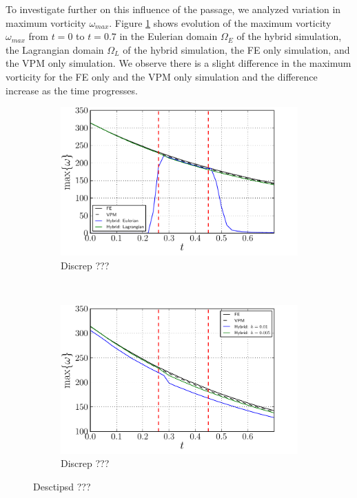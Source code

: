 To investigate further on this influence of the passage, we analyzed variation in maximum vorticity $\omega_{max}$. Figure \ref{fig:hybrid_dipoleConvection_hybridSubDomains_wMax} shows evolution of the maximum vorticity $\omega_{max}$ from $t=0$ to $t=0.7$ in the Eulerian domain $\Omega_E$ of the hybrid simulation, the Lagrangian domain $\Omega_L$ of the hybrid simulation, the FE only simulation, and the VPM only simulation. We observe there is a slight difference in the maximum vorticity for the FE only and the VPM only simulation and the difference increase as the time progresses. 

	\begin{figure}[!h]
     \centering
     \begin{subfigure}[t]{0.48\textwidth}
             \includegraphics[width=\linewidth]{./figures/hybrid/cbConv/hybrid_dipoleConvection_hybridSubDomains_wMax.pdf}
             \caption{Discrep ???}
             \label{fig:hybrid_dipoleConvection_hybridSubDomains_wMax}
     \end{subfigure}     
     ~ %
     \begin{subfigure}[t]{0.48\textwidth}
             \includegraphics[width=\linewidth]{./figures/hybrid/cbConv/hybrid_dipoleConvection_comparison_parameter_wMax.pdf}
             \caption{Discrep ???}
             \label{fig:hybrid_dipoleConvection_comparison_parameter_wMax}
     \end{subfigure}        
     
     \caption{Desctipsd ???}
     \label{fig:hybrid_dipoleConvection_comparison_wMax}
	\end{figure}	
	
